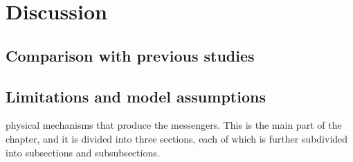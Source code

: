 


\chapter{Discussion}
\section{Comparison with previous studies}
\section{Limitations and model assumptions}



physical mechanisms that produce the messengers. This is the main part of the chapter, and it is divided into three sections, each of which is further subdivided into subsections and subsubsections.




